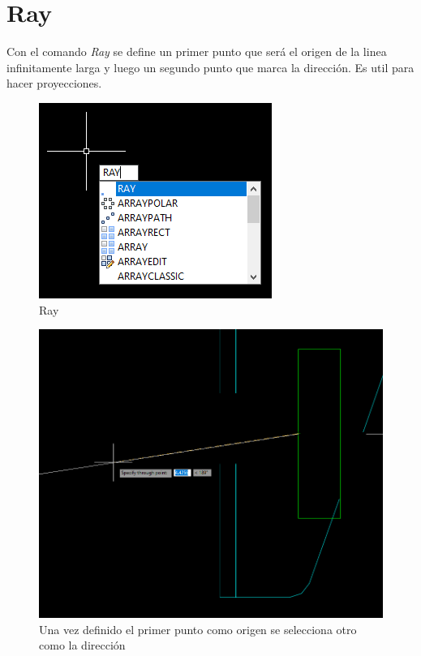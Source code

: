 \documentclass[12pt,letterpaper,final]{report}
\begin{document}
\chapter{Ray}

Con el comando \emph{Ray} se define un primer punto que será el origen de la linea infinitamente larga y luego un segundo punto que marca la dirección. Es util para hacer proyecciones.

\begin{figure}[H]
	\centering
	\includegraphics[width=0.65\linewidth, height=0.5\textheight,keepaspectratio]{Imagenes/autocad_ray01}
	\caption{Ray}
	\label{fig:autocadray01}
\end{figure}

\begin{figure}[H]
	\centering
	\includegraphics[width=0.75\linewidth, height=0.5\textheight,keepaspectratio]{Imagenes/autocad_ray02}
	\caption{Una vez definido el primer punto como origen se selecciona otro como la dirección}
	\label{fig:autocadray02}
\end{figure}
\end{document}
